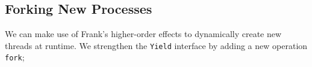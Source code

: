 \documentclass[msc,deptreport,cs]{infthesis} %
\newcommand{\code}[1]{\lstinline{#1}}
\newcommand{\todo}[1]
           {{\par\noindent\small\color{RoyalPurple}
  \framebox{\parbox{\dimexpr\linewidth-2\fboxsep-2\fboxrule}
    {\textbf{TODO:} #1}}}}
\begin{document}






\subsection{Forking New Processes}
\label{subsec:forking-new-processes}

We can make use of Frank's higher-order effects to dynamically create new
threads at runtime. We strengthen the \code{Yield} interface by adding a new
operation \code{fork};
\end{document}
